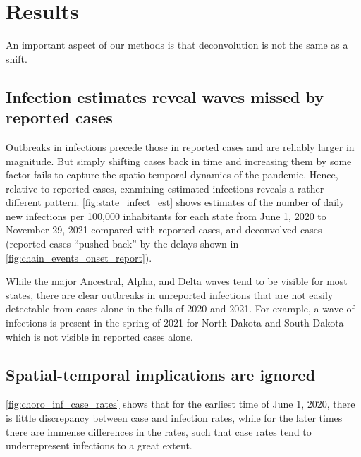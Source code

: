 \section{Results}
\label{sec:results}

An important aspect of our methods is that deconvolution is not the same as a
shift. 


\subsection{Infection estimates reveal waves missed by reported cases}
\label{sec:omitted-waves}

Outbreaks in infections precede those in reported cases and are reliably larger
in magnitude. But simply shifting cases back in time and increasing them by some
factor fails to capture the spatio-temporal dynamics of the pandemic. 
Hence, relative to reported cases, examining estimated infections reveals a
rather different pattern. \autoref{fig:state_infect_est} shows
estimates of the number of daily new infections per 100,000 inhabitants for each
\US state from June 1, 2020 to November 29, 2021 compared with reported cases,
and deconvolved cases (reported cases ``pushed back'' by the delays shown in
\autoref{fig:chain_events_onset_report}). 

While the major Ancestral, Alpha, and Delta waves tend to be visible for most
states, there are clear outbreaks in unreported infections that are not easily
detectable from cases alone in the falls of 2020 and 2021. For example, a wave 
of infections is present in the spring of 2021 for North Dakota and South Dakota
which is not visible in reported cases alone. 

\subsection{Spatial-temporal implications are ignored}
\label{sec:ignored-patterns}


\autoref{fig:choro_inf_case_rates} shows that for the
earliest time of June 1, 2020, there is little discrepancy between case and
infection rates, while for the later times there are immense differences in the
rates, such that case rates tend to underrepresent infections to a great extent.



